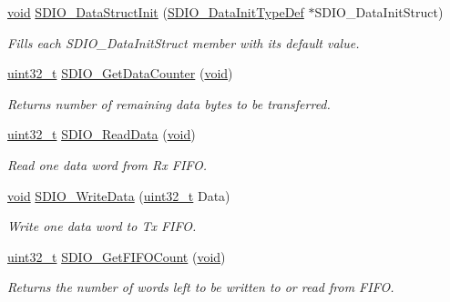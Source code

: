 \begin{DoxyCompactItemize}
\hyperlink{usb__devapi_8h_afabf60e7f57651d6d595a02c75f07cd0}{void} \hyperlink{group___s_d_i_o___private___functions_gaa83209c09e921521aca2587fb5b22ea2}{S\+D\+I\+O\+\_\+\+Data\+Struct\+Init} (\hyperlink{struct_s_d_i_o___data_init_type_def}{S\+D\+I\+O\+\_\+\+Data\+Init\+Type\+Def} $\ast$S\+D\+I\+O\+\_\+\+Data\+Init\+Struct)
\begin{DoxyCompactList}\small\item\em Fills each S\+D\+I\+O\+\_\+\+Data\+Init\+Struct member with its default value. \end{DoxyCompactList}\item 
\hyperlink{_p_e___types_8h_a33594304e786b158f3fb30289278f5af}{uint32\+\_\+t} \hyperlink{group___s_d_i_o___private___functions_ga7a28aaa2c25a9a5a8db1f49b0e8c9d0a}{S\+D\+I\+O\+\_\+\+Get\+Data\+Counter} (\hyperlink{usb__devapi_8h_afabf60e7f57651d6d595a02c75f07cd0}{void})
\begin{DoxyCompactList}\small\item\em Returns number of remaining data bytes to be transferred. \end{DoxyCompactList}\item 
\hyperlink{_p_e___types_8h_a33594304e786b158f3fb30289278f5af}{uint32\+\_\+t} \hyperlink{group___s_d_i_o___private___functions_ga4e8ac755ef3c31ecd4ed2708df19187e}{S\+D\+I\+O\+\_\+\+Read\+Data} (\hyperlink{usb__devapi_8h_afabf60e7f57651d6d595a02c75f07cd0}{void})
\begin{DoxyCompactList}\small\item\em Read one data word from Rx F\+I\+FO. \end{DoxyCompactList}\item 
\hyperlink{usb__devapi_8h_afabf60e7f57651d6d595a02c75f07cd0}{void} \hyperlink{group___s_d_i_o___private___functions_ga361008b5252aa33b5f2b5823ee3d7240}{S\+D\+I\+O\+\_\+\+Write\+Data} (\hyperlink{_p_e___types_8h_a33594304e786b158f3fb30289278f5af}{uint32\+\_\+t} Data)
\begin{DoxyCompactList}\small\item\em Write one data word to Tx F\+I\+FO. \end{DoxyCompactList}\item 
\hyperlink{_p_e___types_8h_a33594304e786b158f3fb30289278f5af}{uint32\+\_\+t} \hyperlink{group___s_d_i_o___private___functions_ga9a3343983a2d68b5164a1c89797d2dd6}{S\+D\+I\+O\+\_\+\+Get\+F\+I\+F\+O\+Count} (\hyperlink{usb__devapi_8h_afabf60e7f57651d6d595a02c75f07cd0}{void})
\begin{DoxyCompactList}\small\item\em Returns the number of words left to be written to or read from F\+I\+FO. \end{DoxyCompactList}\item 

\end{DoxyCompactItemize}
